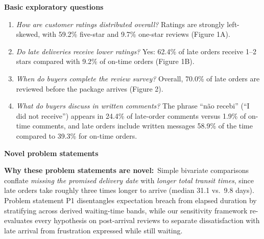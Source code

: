 \documentclass[10pt,a4paper,twocolumn]{article}
\newcommand{\field}[2]{\textbf{#1}~#2\par}
\newcommand{\minihead}[1]{\par\needspace{8\baselineskip}\smallskip\textbf{#1}\par}
\begin{document}
\minihead{Basic exploratory questions}
\begin{enumerate}[label=\arabic*.]
  \item \emph{How are customer ratings distributed overall?} Ratings are strongly left-skewed, with 59.2\% five-star
  and 9.7\% one-star reviews (Figure 1A).
  \item \emph{Do late deliveries receive lower ratings?} Yes: 62.4\% of late orders receive 1--2 stars compared with
  9.2\% of on-time orders (Figure 1B).
  \item \emph{When do buyers complete the review survey?} Overall, 70.0\% of late orders are reviewed before the
  package arrives (Figure 2).
  \item \emph{What do buyers discuss in written comments?} The phrase ``n\~ao recebi'' (``I did not receive'') appears
  in 24.4\% of late-order comments versus 1.9\% of on-time comments, and late orders include written messages
  58.9\% of the time compared to 39.3\% for on-time orders.
\end{enumerate}

\minihead{Novel problem statements}
\noindent{}

\field{Why these problem statements are novel:}{Simple bivariate comparisons conflate \emph{missing the promised
delivery date} with \emph{longer total transit times}, since late orders take roughly three times longer to arrive
(median 31.1 vs.\ 9.8 days). Problem statement P1 disentangles expectation breach from elapsed duration by stratifying
across derived waiting-time bands, while our sensitivity framework re-evaluates every hypothesis on post-arrival
reviews to separate dissatisfaction with late arrival from frustration expressed while still waiting.}
\end{document}
